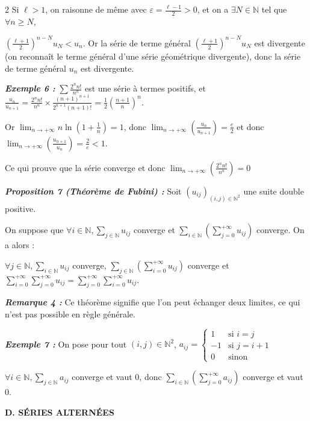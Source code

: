 \documentclass[10pt,a4paper]{article}
\begin{document}
\begin{multicols}{2}
Si $\ell > 1$, on raisonne de même avec $\varepsilon = \frac{\ell-1}{2} > 0$, et on a $\exists N \in \mathbb{N}$ tel que $\forall n \ge N$,

$\left(\frac{\ell+1}{2}\right)^{n-N}u_N < u_n$. Or la série de terme général $\left(\frac{\ell+1}{2}\right)^{n-N}u_N$ est divergente (on reconnaît le terme général d'une série géométrique divergente), donc la série de terme général $u_n$ est divergente.

\textbf{\textit{Exemple 6 :}} $\sum \frac{2^n n!}{n^n}$ est une série à termes positifs, et $\frac{u_n}{u_{n+1}} = \frac{2^n n!}{n^n} \times \frac{(n+1)^{n+1}}{2^{n+1}(n+1)!} = \frac{1}{2}\left(\frac{n+1}{n}\right)^n$.

Or $\lim_{n \to +\infty} n \ln\left(1 + \frac{1}{n}\right) = 1$, donc $\lim_{n \to +\infty}\left(\frac{u_n}{u_{n+1}}\right) = \frac{e}{2}$ et donc $\lim_{n \to +\infty}\left(\frac{u_{n+1}}{u_n}\right) = \frac{2}{e} < 1$.

Ce qui prouve que la série converge et donc $\lim_{n \to +\infty}\left(\frac{2^n n!}{n^n}\right) = 0$

\textbf{\textit{Proposition 7 (Théorème de Fubini) :}} Soit $(u_{ij})_{(i,j) \in \mathbb{N}^2}$ une suite double positive.

On suppose que $\forall i \in \mathbb{N}, \sum_{j \in \mathbb{N}} u_{ij}$ converge et $\sum_{i \in \mathbb{N}} \left(\sum_{j=0}^{+\infty} u_{ij}\right)$ converge. On a alors :

$\forall j \in \mathbb{N}, \sum_{i \in \mathbb{N}} u_{ij}$ converge, $\sum_{j \in \mathbb{N}} \left(\sum_{i=0}^{+\infty} u_{ij}\right)$ converge et $\sum_{i=0}^{+\infty} \sum_{j=0}^{+\infty} u_{ij} = \sum_{j=0}^{+\infty} \sum_{i=0}^{+\infty} u_{ij}$.

\textbf{\textit{Remarque 4 :}} Ce théorème signifie que l'on peut échanger deux limites, ce qui n'est pas possible en règle générale.

\textbf{\textit{Exemple 7 :}} On pose pour tout $(i,j) \in \mathbb{N}^2$, $a_{ij} = \begin{cases} 1 & \text{si } i = j \\ -1 & \text{si } j = i + 1 \\ 0 & \text{sinon} \end{cases}$

$\forall i \in \mathbb{N}, \sum_{j \in \mathbb{N}} a_{ij}$ converge et vaut 0, donc $\sum_{i \in \mathbb{N}} \left(\sum_{j=0}^{+\infty} a_{ij}\right)$ converge et vaut 0.

\vspace{0.1cm}
\textbf{\textcolor{maingreen}{D. SÉRIES ALTERNÉES}}


\end{multicols}
\end{document}
